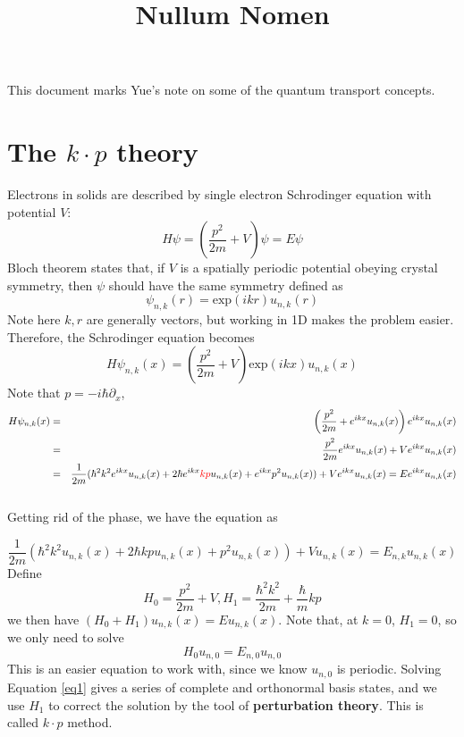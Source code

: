 \documentclass{article}
\title{Nullum Nomen}
\date{}
\author{}
\begin{document}
\maketitle


This document marks Yue's note on some of the quantum transport concepts.

\section{The $k \cdot p$ theory}

Electrons in solids are described by single electron Schrodinger equation with potential $V$:
\begin{equation}
    H\psi=(\dfrac{p^2}{2m}+V)\psi=E\psi
\end{equation}
Bloch theorem states that, if $V$ is a spatially periodic potential obeying crystal symmetry, then $\psi$ should have the same symmetry defined as
\begin{equation}
    \psi_{n,k}(r)=\text{exp}(ikr)u_{n,k}(r)
\end{equation}
Note here $k,r$ are generally vectors, but working in 1D makes the problem easier.  Therefore, the Schrodinger equation becomes
\begin{equation}
    H\psi_{n,k}(x)=(\dfrac{p^2}{2m}+V)\text{exp}(ikx)u_{n,k}(x)
\end{equation}
Note that $p=-i\hbar \partial_x$,
\begin{eqnarray*}
  H \psi_{n, k} (x) & = & \left( \dfrac{p^2}{2 m} + e^{i k x} u_{n, k} (x)
  \right) e^{i k x} u_{n, k} (x)\\
  & = & \dfrac{p^2}{2 m} e^{i k x} u_{n, k} (x) + V e^{i k x} u_{n, k} (x)\\
  & = & \dfrac{1}{2 m} (\hbar^2 k^2 e^{i k x} u_{n, k} (x) + 2 \hbar e^{i k
  x} \textcolor{red}{k p} u_{n, k} (x) + e^{i k x} p^2 u_{n, k} (x)) + V e^{i k x} u_{n, k}
  (x) =  E e^{i k x} u_{n, k} (x)\\
  &  & 
\end{eqnarray*}
Getting rid of the phase, we have the equation as

 \begin{equation}
     \dfrac{1}{2 m} (\hbar^2 k^2 u_{n, k} (x) + 2 \hbar k p u_{n, k} (x) + p^2  u_{n, k} (x)) + V u_{n, k} (x) = E_{n, k} u_{n, k} (x) 
 \end{equation}
Define
\begin{equation}
    H_0=\dfrac{p^2}{2m}+V, H_1=\dfrac{\hbar^2k^2}{2m}+\dfrac{\hbar}{m}kp
\end{equation}
we then have $(H_0 + H_1) u_{n,k}(x) = Eu_{n,k}(x)$. Note that, at $k = 0$, $H_1=0$, so we only need to solve
\begin{equation}
    H_0 u_{n,0} = E_{n,0}u_{n,0}
    \label{eq1}
\end{equation}
This is an easier equation to work with, since we know $u_{n,0}$ is periodic. Solving Equation \ref{eq1} gives a series of complete and orthonormal basis states, and we use $H_1$ to correct the solution by the tool of \textbf{perturbation theory}. This is called $k\cdot p$ method.
\end{document}
